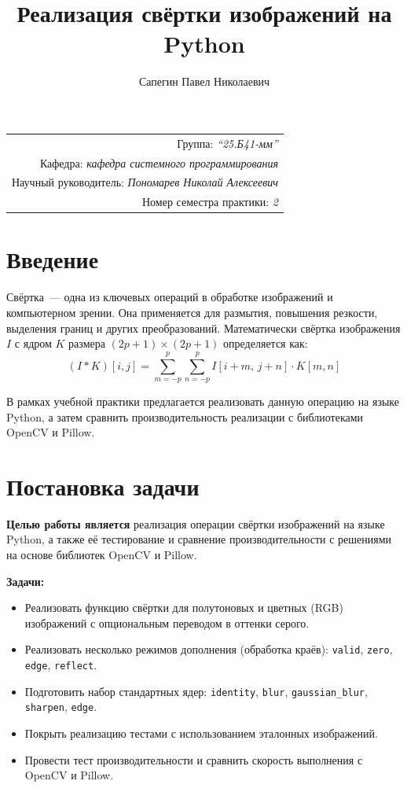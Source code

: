\documentclass[a4paper]{article}
\title{Реализация свёртки изображений на Python}
\author{Сапегин Павел Николаевич}
\date{}
\begin{document}
\maketitle
\begin{flushright}
\begin{tabular}{r}
    Группа: \emph{\enquote{25.Б41-мм}} \\
    Кафедра: \emph{кафедра системного программирования} \\
    Научный руководитель: \emph{Пономарев Николай Алексеевич} \\
    Номер семестра практики: \emph{2} \\
\end{tabular}
\end{flushright}

\section{Введение}

Свёртка~--- одна из ключевых операций в обработке изображений и компьютерном зрении. Она применяется для размытия, повышения резкости, выделения границ и других преобразований. Математически свёртка изображения $I$ с ядром $K$ размера $(2p+1) \times (2p+1)$ определяется как:
\[
(I * K)[i, j] = \sum_{m=-p}^{p} \sum_{n=-p}^{p} I[i+m,\, j+n] \cdot K[m, n]
\]

В рамках учебной практики предлагается реализовать данную операцию на языке Python, а затем сравнить производительность реализации с библиотеками OpenCV и Pillow.

\section{Постановка задачи}

\textbf{Целью работы является} реализация операции свёртки изображений на языке Python, а также её тестирование и сравнение производительности с решениями на основе библиотек OpenCV и Pillow.

\textbf{Задачи:}
\begin{itemize}
    \item Реализовать функцию свёртки для полутоновых и цветных (RGB) изображений с опциональным переводом в оттенки серого.
    \item Реализовать несколько режимов дополнения (обработка краёв): \verb|valid|, \verb|zero|, \verb|edge|, \verb|reflect|.
    \item Подготовить набор стандартных ядер: \verb|identity|, \verb|blur|, \verb|gaussian_blur|, \verb|sharpen|, \verb|edge|.
    \item Покрыть реализацию тестами с использованием эталонных изображений.
    \item Провести тест производительности и сравнить скорость выполнения с OpenCV и Pillow.
\end{itemize}
\end{document}
